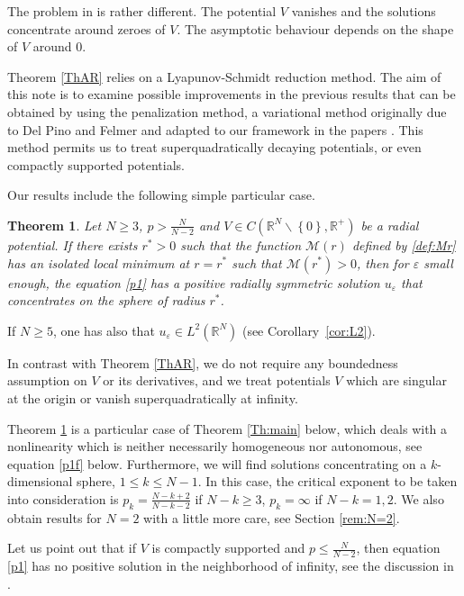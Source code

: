 \documentclass[a4paper]{amsart}
\newtheorem{theorem}{Theorem}
\begin{document}
The problem in \cite{ByW} is rather different. The potential $V$ vanishes and the solutions concentrate around zeroes of
$V$. The asymptotic behaviour depends on the shape of $V$ around $0$.

Theorem \ref{ThAR} relies on a Lyapunov-Schmidt reduction method. The aim of this note is to examine possible
improvements in the previous results that can be obtained by using the penalization method, a variational method
originally due to Del Pino and Felmer \cite{DF1} and adapted to our framework in the papers . This method
permits us to treat superquadratically decaying potentials, or even compactly supported potentials.
 
Our results include the following simple particular case.
\begin{theorem}\label{theo:special}
 Let $N \geq 3$, $p>\frac{N}{N-2}$ and $V \in C({\mathbb{R}}^N \backslash \left\{ 0 \right\},{\mathbb{R}}^+)$ be a
radial potential. If there exists $r^* > 0$ such that the function $\mathcal{M}(r)$ defined by
\eqref{def:Mr} has an isolated local minimum at $r = r^*$ such that $\mathcal{M}(r^*)>0$, then for
$\varepsilon$ small enough, the equation \eqref{p1} has a positive radially symmetric solution
$u_{\varepsilon}$ that concentrates on the sphere of radius $r^*$.
\end{theorem}

If $N \geq 5$, one has also that $u_\varepsilon \in L^2({\mathbb{R}}^N)$ (see Corollary~\ref{cor:L2}).

In contrast with Theorem \ref{ThAR}, we do not require any boundedness assumption on $V$ or its derivatives, and we
treat potentials $V$ which are singular at the origin or vanish superquadratically at infinity.

Theorem \ref{theo:special} is a particular case of Theorem \ref{Th:main} below, which deals with a nonlinearity which is
neither necessarily homogeneous nor autonomous, see equation \eqref{p1f} below. Furthermore, we will find solutions
concentrating on a $k$-dimensional sphere, $1 \leq k \leq N-1$. In this case, the critical exponent to be taken into
consideration is $p_k = \frac{N-k+2}{N-k-2}$ if $N-k \geq 3$, $p_k = \infty$ if $N-k = 1,2$. We also obtain results for $N=2$ with a little more care, see Section \ref{rem:N=2}.

Let us point out that if $V$ is compactly supported and $p \leq \frac{N}{N-2}$, then equation \eqref{p1} has no positive
solution in the neighborhood of infinity, see the discussion in \cite{MVS}.
\end{document}
